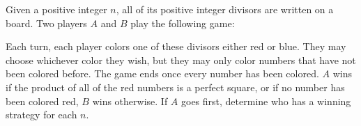 Given a positive integer $n$,  all of its positive integer divisors are written on a board. Two players $A$ and $B$ play the following game:

Each turn, each player colors one of these divisors either red or blue. They may choose whichever color they wish, but they may only color numbers that have not been colored before. The game ends once every number has been colored. $A$ wins if the product of all of the red numbers is a perfect square, or if no number has been colored red, $B$ wins otherwise. If $A$ goes first, determine who has a winning strategy for each $n$.